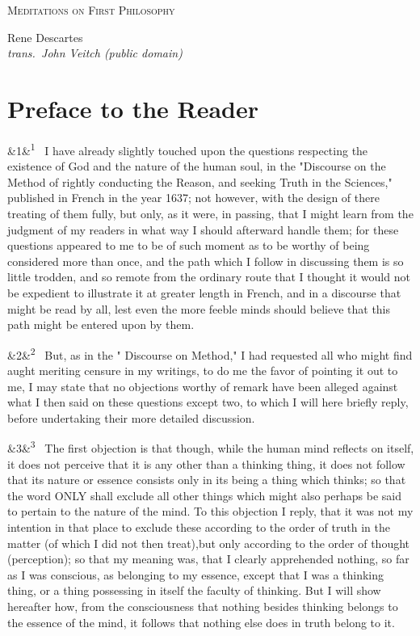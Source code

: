 \documentclass[12pt]{article}
\newcommand{\work}[1]{\begin{center}\LARGE\scshape #1\end{center}}
\newcommand{\attrib}[2]{\begin{center}\large #1\\[2pt]\small\itshape trans.\ #2\end{center}\vspace{1em}}
\newcommand{\para}[1][]{\par\noindent\ifx&#1&\else\textsuperscript{\footnotesize #1}~\fi}
\begin{document}
\work{Meditations on First Philosophy}
\attrib{Rene Descartes}{John Veitch (public domain)}

\section*{Preface to the Reader}

\para[1] I have already slightly touched upon the questions respecting the existence of God and the nature of the human soul, in the "Discourse on the Method of rightly conducting the Reason, and seeking Truth in the Sciences," published in French in the year 1637; not however, with the design of there treating of them fully, but only, as it were, in passing, that I might learn from the judgment of my readers in what way I should afterward handle them; for these questions appeared to me to be of such moment as to be worthy of being considered more than once, and the path which I follow in discussing them is so little trodden, and so remote from the ordinary route that I thought it would not be expedient to illustrate it at greater length in French, and in a discourse that might be read by all, lest even the more feeble minds should believe that this path might be entered upon by them.

\para[2] But, as in the " Discourse on Method," I had requested all who might find aught meriting censure in my writings, to do me the favor of pointing it out to me, I may state that no objections worthy of remark have been alleged against what I then said on these questions except two, to which I will here briefly reply, before undertaking their more detailed discussion.

\para[3] The first objection is that though, while the human mind reflects on itself, it does not perceive that it is any other than a thinking thing, it does not follow that its nature or essence consists only in its being a thing which thinks; so that the word ONLY shall exclude all other things which might also perhaps be said to pertain to the nature of the mind. To this objection I reply, that it was not my intention in that place to exclude these according to the order of truth in the matter (of which I did not then treat),but only according to the order of thought (perception); so that my meaning was, that I clearly apprehended nothing, so far as I was conscious, as belonging to my essence, except that I was a thinking thing, or a thing possessing in itself the faculty of thinking. But I will show hereafter how, from the consciousness that nothing besides thinking belongs to the essence of the mind, it follows that nothing else does in truth belong to it.
\end{document}
